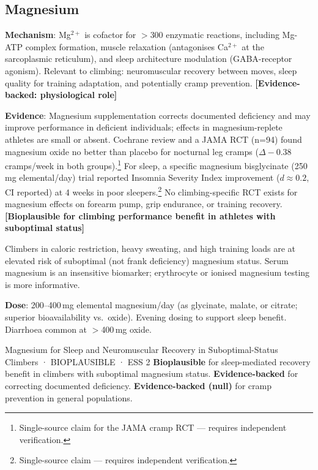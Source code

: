 \subsection{Magnesium}
\label{subsec:magnesium}

\textbf{Mechanism}: Mg$^{2+}$ is cofactor for $>$300 enzymatic reactions, including Mg-ATP complex formation, muscle relaxation (antagonises Ca$^{2+}$ at the sarcoplasmic reticulum), and sleep architecture modulation (GABA-receptor agonism). Relevant to climbing: neuromuscular recovery between moves, sleep quality for training adaptation, and potentially cramp prevention. \textbf{[Evidence-backed: physiological role]}

\textbf{Evidence}: Magnesium supplementation corrects documented deficiency and may improve performance in deficient individuals; effects in magnesium-replete athletes are small or absent. Cochrane review and a JAMA RCT (n=94) found magnesium oxide no better than placebo for nocturnal leg cramps ($\Delta -0.38$ cramps/week in both groups).\footnote{Single-source claim for the JAMA cramp RCT --- requires independent verification.} For sleep, a specific magnesium bisglycinate (250\,mg elemental/day) trial reported Insomnia Severity Index improvement ($d{\approx}0.2$, CI reported) at 4 weeks in poor sleepers.\footnote{Single-source claim --- requires independent verification.} No climbing-specific RCT exists for magnesium effects on forearm pump, grip endurance, or training recovery. \textbf{[Bioplausible for climbing performance benefit in athletes with suboptimal status]}

Climbers in caloric restriction, heavy sweating, and high training loads are at elevated risk of suboptimal (not frank deficiency) magnesium status. Serum magnesium is an insensitive biomarker; erythrocyte or ionised magnesium testing is more informative.

\textbf{Dose}: 200--400\,mg elemental magnesium/day (as glycinate, malate, or citrate; superior bioavailability vs.\ oxide). Evening dosing to support sleep benefit. Diarrhoea common at $>$400\,mg oxide.

\begin{bioplausbox}{Magnesium for Sleep and Neuromuscular Recovery in Suboptimal-Status Climbers · BIOPLAUSIBLE · ESS 2}
\textbf{Bioplausible} for sleep-mediated recovery benefit in climbers with suboptimal magnesium status. \textbf{Evidence-backed} for correcting documented deficiency. \textbf{Evidence-backed (null)} for cramp prevention in general populations.
\end{bioplausbox}

